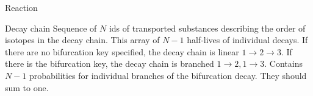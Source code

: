 \begin{recordtype}{Reaction}{}
%
%
%
\end{recordtype}

\begin{recordtype}{Decay chain}{}
Sequence of $N$ ids of transported substances describing the order of isotopes in the decay chain.
This array of $N-1$ half-lives of individual decays.
If there are no bifurcation key specified, the decay chain is linear $1\to 2 \to 3$.
If there is the bifurcation key, the decay chain is branched $1\to 2, 1\to 3$.
Contains $N-1$ probabilities for individual branches of the bifurcation decay.
They should sum to one.
\end{recordtype}


